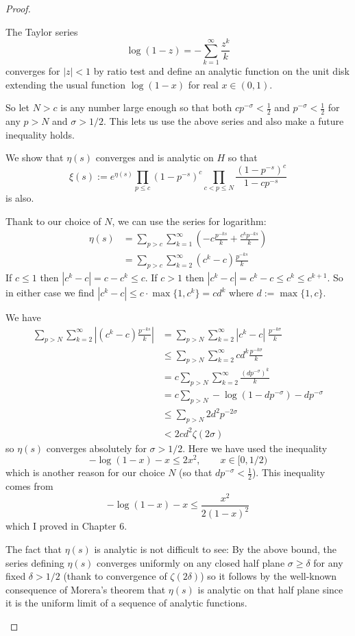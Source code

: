 \documentclass[12pt]{article}
\newcommand{\Abs}[1]{\left| #1 \right|}
\begin{document}
\begin{proof}
\begin{itemize}
The Taylor series
$$\log(1 - z) = - \sum_{k = 1}^{\infty} \frac{z^k}{k}$$
converges for $|z| < 1$ by ratio test and define an analytic function on the unit disk extending the usual function $\log(1 - x)$ for real $x \in (0, 1)$.

So let $N > c$ is any number large enough so that both $c p^{-\sigma} < \frac12$ and $p^{-\sigma} < \frac12$ for any $p > N$ and $\sigma > 1/2$. This lets us use the above series and also make a future inequality holds.

We show that $\eta(s)$ converges and is analytic on $H$ so that
$$\xi(s) := e^{\eta(s)} \prod_{p \leq c} (1 - p^{-s})^c \prod_{c < p \leq N} \frac{(1 - p^{-s})^c}{1 - cp^{-s}}$$
is also.

Thank to our choice of $N$, we can use the series for logarithm:
\begin{align*}
\eta(s) &= \sum_{p > c} \sum_{k=1}^{\infty} \left( - c \frac{p^{-ks}}{k} + \frac{c^k p^{-ks}}{k} \right)\\
&= \sum_{p > c} \sum_{k=2}^{\infty} (c^k - c) \frac{p^{-ks}}{k}
\end{align*}
If $c \leq 1$ then $|c^k - c| = c - c^k \leq c$. If $c > 1$ then $|c^k - c| = c^k - c \leq c^k \leq c^{k+1}$. So in either case we find $|c^k - c| \leq c \cdot \max\{1, c^k\} = c d^k$ where $d := \max\{1, c\}$.

We have
\begin{align*}
\sum_{p > N} \sum_{k=2}^{\infty} \Abs{ (c^k - c) \frac{p^{-ks}}{k} } &= \sum_{p > N} \sum_{k=2}^{\infty} |c^k - c| \;   \frac{p^{-k\sigma}}{k}\\
&\leq \sum_{p > N} \sum_{k=2}^{\infty} c d^k \frac{p^{-k\sigma}}{k} \\
&= c \sum_{p > N} \sum_{k=2}^{\infty} \frac{(d p^{-\sigma})^k}{k} \\
&= c \sum_{p > N} - \log(1 - dp^{-\sigma}) - d p^{-\sigma} \\
&\leq \sum_{p > N} 2 d^2 p^{-2\sigma} \\
&< 2 c d^2 \zeta(2\sigma)
\end{align*}
so $\eta(s)$ converges absolutely for $\sigma > 1/2$. Here we have used the inequality
$$- \log(1 - x) - x \leq 2 x^2, \qquad x \in [0, 1/2)$$
which is another reason for our choice $N$ (so that $dp^{-\sigma} < \frac12$). This inequality comes from
$$- \log(1 - x) - x \leq \frac{x^2}{2(1-x)^2}$$
which I proved in Chapter 6.

The fact that $\eta(s)$ is analytic is not difficult to see: By the above bound, the series defining $\eta(s)$ converges uniformly on any closed half plane $\sigma \geq \delta$ for any fixed $\delta > 1/2$ (thank to convergence of $\zeta(2 \delta)$) so it follows by the well-known consequence of Morera's theorem that $\eta(s)$ is analytic on that half plane since it is the uniform limit of a sequence of analytic functions.


\end{itemize}
\end{proof}
\end{document}
